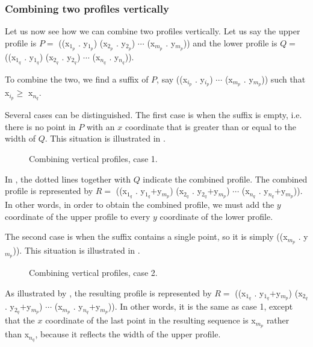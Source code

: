 \subsubsection{Combining two profiles vertically}

Let us now see how we can combine two profiles vertically.  Let us say
the upper profile is $P = $ ((x$_{1_p}$ . y$_{1_p}$) (x$_{2_p}$
. y$_{2_p}$) $\cdots$ (x$_{m_p}$ . y$_{m_p}$)) and the lower profile
is $Q = $ ((x$_{1_q}$ . y$_{1_q}$) (x$_{2_q}$ . y$_{2_q}$) $\cdots$
(x$_{n_q}$ . y$_{n_q}$)).

To combine the two, we find a suffix of $P$, say ((x$_{i_p}$
. y$_{i_p}$) $\cdots$ (x$_{m_p}$ . y$_{m_p}$)) such that x$_{i_p} \ge $
x$_{n_q}$.

Several cases can be distinguished.  The first case is when the suffix
is empty, i.e. there is no point in $P$ with an $x$ coordinate that is
greater than or equal to the width of $Q$.  This situation is
illustrated in .

\begin{figure}
\begin{center}
\end{center}
\caption{\label{fig-profile-vertical-case-1}
Combining vertical profiles, case 1.}
\end{figure}

In , the dotted lines together
with $Q$ indicate the combined profile.  The combined profile is
represented by $R = $ ((x$_{1_q}$ . y$_{1_q}$$+$y$_{m_p}$) (x$_{2_q}$
. y$_{2_q}$$+$y$_{m_p}$) $\cdots$ (x$_{n_q}$
. y$_{n_q}$$+$y$_{m_p}$)).  In other words, in order to obtain the
combined profile, we must add the $y$ coordinate of the upper profile
to every $y$ coordinate of the lower profile.

The second case is when the suffix contains a single point, so it is
simply ((x$_{m_p}$ . y$_{m_p}$)).  This situation is
illustrated in .

\begin{figure}
\begin{center}
\end{center}
\caption{\label{fig-profile-vertical-case-2}
Combining vertical profiles, case 2.}
\end{figure}

As illustrated by , the resulting
profile is represented by $R = $ ((x$_{1_q}$ . y$_{1_q}$$+$y$_{m_p}$)
(x$_{2_q}$ . y$_{2_q}$$+$y$_{m_p}$) $\cdots$ (x$_{m_p}$
. y$_{n_q}$$+$y$_{m_p}$)).  In other words, it is the same as case 1,
except that the $x$ coordinate of the last point in the resulting
sequence is x$_{m_p}$ rather than x$_{n_q}$, because it reflects the
width of the upper profile.

